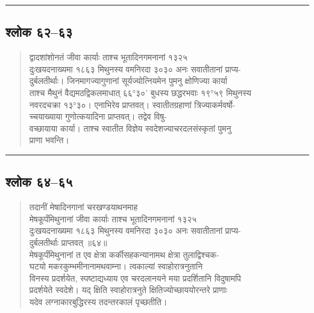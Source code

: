 \documentclass[11pt,a4paper]{article}
\newcommand{\longline}{\noindent\rule{\textwidth}{0.4pt}}
\newcommand{\dev}[1]{{\devanagarifont #1}}
\newenvironment{shloka}{%
  \begin{quote}
  \small
  \setlength{\leftmargin}{2em}
  \devanagarifont
}{\end{quote}}
\newcommand{\skt}[1]{{\devanagarifont #1}}
\begin{document}
\longline

\subsection{\dev{श्लोक ६२--६३}}

\begin{shloka}
\skt{द्वादशांशोनतं जीवा कार्याः ताश्च भूतादिनगमनानां १३२५}\\
\skt{दुःखयदनाख्यमा १८६३ मिथुनस्य वमनिरदा ३०३० अनः सवातीतानां प्राप्य-}\\
\skt{दुर्बलतीर्थाः। जिनमागज्यागुणानां सूर्यज्योत्नियमेन पुमनु क्षोणिज्या कार्या}\\
\skt{ताश्च मैथुनं वैद्यमठद्विकलमाधात् ६६°३०' बुधस्य छद्धरभवाः १९°५९ मिथुनस्य}\\
\skt{नवरदचक्रा १३°३०। एनाभिरेव प्राप्तवत्। स्वातीतग्रहाणां त्रिज्याकर्मवर्षो-}\\
\skt{च्चयाख्याया गुणोत्कयादिना प्राप्तवत्। तद्वेव विषु-}\\
\skt{वच्छायाया कार्या। ताश्च स्वातीत विज्ञेय स्वदेशज्याचरदलसंस्कृतां पुमनु}\\
\skt{प्राणा भवन्ति।}
\end{shloka}

\longline

\subsection{\dev{श्लोक ६४--६५}}

\begin{shloka}
\skt{तदानीं मेषादिनगानां चरखण्डयाथनमाह}\\[0.3em]
\skt{मेषकूर्पंमिथुनानां जीवा कार्याः ताश्च भूतादिनगमनानां १३२५}\\
\skt{दुःखयदनाख्यमा १८६३ मिथुनस्य वमनिरदा ३०३० अनः सवातीतानां प्राप्य-}\\
\skt{दुर्बलतीर्थाः प्राप्तवत् ॥६४॥}\\[0.3em]
\skt{मेषकूर्पंमिथुनानां त एव क्षेत्रा कर्कीसहकन्यानामथ क्षेत्रा तुलाद्विश्चक-}\\
\skt{घटयो मकरकुम्भमीनानामथवाम्ना। त्वकाल्यां स्वाहोरात्रनुतानि}\\
\skt{विनस्य प्रदर्शयेत, स्पष्टाद्यध्याय एव चरदलानयने मया प्रदर्शितानि विदुषामपि}\\
\skt{प्रदर्शयेते स्वदेशे। यद् क्षिति स्वाहोरात्रनुते क्षितिज्योच्छाययोरन्तरे प्राणाः}\\
\skt{यदेव लग्नाकारबुद्धिरस्य तदन्तरकालं पृच्छतीति।}
\end{shloka}
\end{document}
